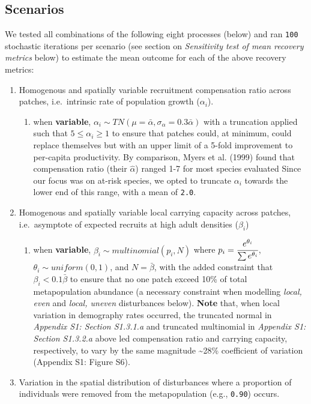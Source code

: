 \documentclass[
]{article}
\providecommand{\tightlist}{%
  \setlength{\itemsep}{0pt}\setlength{\parskip}{0pt}}
\begin{document}
\hypertarget{scenarios}{%
\subsection{Scenarios}\label{scenarios}}

We tested all combinations of the following eight processes (below) and
ran \texttt{100} stochastic iterations per scenario (see section on
\emph{Sensitivity test of mean recovery metrics} below) to estimate the
mean outcome for each of the above recovery metrics:

\begin{enumerate}
\def\labelenumi{\arabic{enumi}.}
\item
  Homogenous and spatially variable recruitment compensation ratio
  across patches, i.e.~intrinsic rate of population growth
  (\(\alpha_i\)).

  \begin{enumerate}
  \def\labelenumii{\alph{enumii}.}
  \tightlist
  \item
    when \textbf{variable},
    \(\alpha_i \sim TN(\mu=\bar{\alpha}, \sigma_{\alpha}=0.3\bar{\alpha})\)
    with a truncation applied such that \(5 \leq \alpha_i \geq 1\) to
    ensure that patches could, at minimum, could replace themselves but
    with an upper limit of a 5-fold improvement to per-capita
    productivity. By comparison, Myers et al. (1999) found that
    compensation ratio (their \(\hat\alpha\)) ranged 1-7 for most
    species evaluated Since our focus was on at-risk species, we opted
    to truncate \(\alpha_i\) towards the lower end of this range, with a
    mean of \texttt{2.0}.
  \end{enumerate}
\item
  Homogenous and spatially variable local carrying capacity across
  patches, i.e.~asymptote of expected recruits at high adult densities
  (\(\beta_i\))

  \begin{enumerate}
  \def\labelenumii{\alph{enumii}.}
  \tightlist
  \item
    when \textbf{variable}, \(\beta_i \sim multinomial(p_i,N)\) where
    \(p_i=\cfrac{e^{\theta_i}}{ \sum{e^{\theta_i}}}\),
    \(\theta_i \sim uniform(0,1)\), and \(N=\bar{\beta}\), with the
    added constraint that \(\beta_i<0.1\bar{\beta}\) to ensure that no
    one patch exceed 10\% of total metapopulation abundance (a necessary
    constraint when modelling \emph{local, even} and \emph{local,
    uneven} disturbances below). \textbf{Note} that, when local
    variation in demography rates occurred, the truncated normal in
    \emph{Appendix S1: Section S1.3.1.a} and truncated multinomial in
    \emph{Appendix S1: Section S1.3.2.a} above led compensation ratio
    and carrying capacity, respectively, to vary by the same magnitude
    \textasciitilde28\% coefficient of variation (Appendix S1: Figure
    S6).
  \end{enumerate}
\item
  Variation in the spatial distribution of disturbances where a
  proportion of individuals were removed from the metapopulation (e.g.,
  \texttt{0.90}) occurs.


\end{enumerate}
\end{document}
